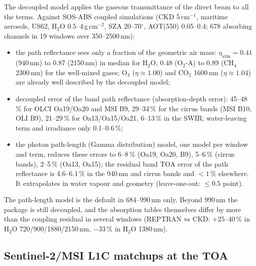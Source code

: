 \documentclass[11pt,a4paper]{article}
\begin{document}
The decoupled model applies the gaseous transmittance of the direct beam to all the terms. Against SOS-ABS
coupled simulations (CKD 5\,cm$^{-1}$, maritime aerosols, US62, H$_2$O 0.5--4\,g\,cm$^{-2}$, SZA 20--70$^\circ$,
AOT(550) 0.05--0.4; 678 absorbing channels in 19 windows over 350--2500\,nm):

\begin{itemize}
\item the path reflectance sees only a fraction of the geometric air mass: $\eta_\mathrm{atm}=0.41$ (940\,nm) to
  0.87 (2150\,nm) in median for H$_2$O, 0.48 (O$_2$-A) to 0.89 (CH$_4$ 2300\,nm) for the well-mixed gases; O$_3$
  ($\eta\approx1.00$) and CO$_2$ 1600\,nm ($\eta\approx1.04$) are already well described by the decoupled model;
\item decoupled error of the band path reflectance (absorption-depth error): 45--48\,\% for OLCI Oa19/Oa20 and
  MSI B9, 29--34\,\% for the cirrus bands (MSI B10, OLI B9), 21--29\,\% for Oa13/Oa15/Oa21, 6--13\,\% in the SWIR;
  water-leaving term and irradiance only 0.1--0.6\,\%;
\item the photon path-length (Gamma distribution) model, one model per window and term, reduces these errors to
  6--8\,\% (Oa19, Oa20, B9), 5--6\,\% (cirrus bands), 2--5\,\% (Oa13, Oa15); the residual band TOA error of the path
  reflectance is 4.6--6.1\,\% in the 940\,nm and cirrus bands and $<1\,\%$ elsewhere. It extrapolates in water
  vapour and geometry (leave-one-out: $\le0.5$ point).
\end{itemize}

The path-length model is the default in 684--990\,nm only. Beyond 990\,nm the package is still decoupled, and
the absorption tables themselves differ by more than the coupling residual in several windows (REPTRAN vs
CKD: $+25$--40\,\% in H$_2$O 720/900/1880/2150\,nm, $-33\,\%$ in H$_2$O 1380\,nm).

\subsection{Sentinel-2/MSI L1C matchups at the TOA}
\label{sec:matchups}
\end{document}
